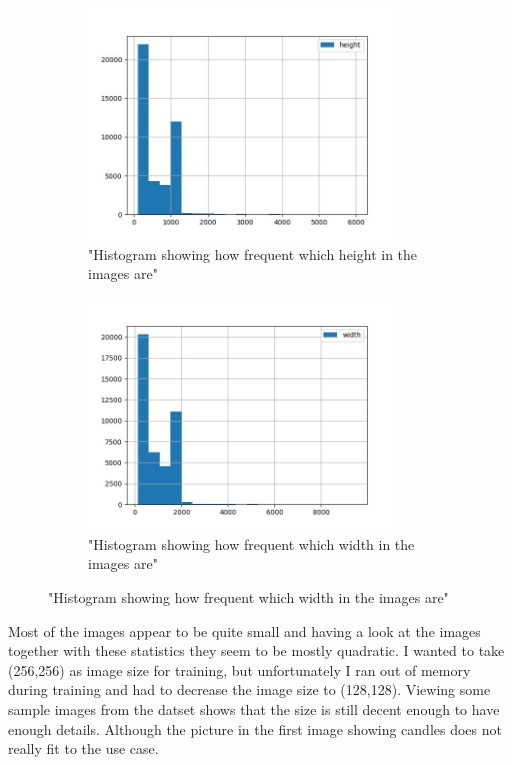 \documentclass[]{article}
\begin{document}
\begin{figure}[H]
	\centering
	\begin{subfigure}{0.45\textwidth}
		\caption{"Histogram showing how frequent which height in the images are"}
		\includegraphics[width=0.9\textwidth, left]{"../visualizations/data_insights/Histogram of images height_original.jpg"}
	\end{subfigure}\hfill
	\begin{subfigure}{0.45\textwidth}
		\caption{"Histogram showing how frequent which width in the images are"}
		\includegraphics[width=0.9\textwidth, right]{"../visualizations/data_insights/Histogram of images width_original.jpg"}
	\end{subfigure}
\end{figure}
Most of the images appear to be quite small and having a look at the images together with these statistics they seem to be mostly quadratic. I wanted to take (256,256) as image size for training, but unfortunately I ran out of memory during training and had to decrease the image size to (128,128). Viewing some sample images from the datset shows that the size is still decent enough to have enough details. Although the picture in the first image showing candles does not really fit to the use case.\\
\end{document}
